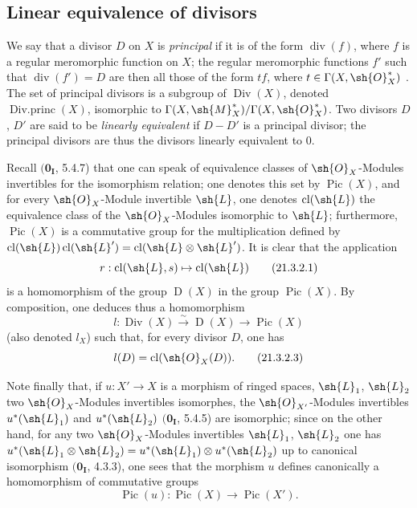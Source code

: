 \subsection{Linear equivalence of divisors}
\label{IV.21.3}


\begin{env}[21.3.1]
\label{IV.21.3.1}
We say that a divisor $D$ on $X$ is \emph{principal} if it is of the form $\operatorname{div}(f)$, where $f$ is a regular meromorphic function on $X$;
the regular meromorphic functions $f'$ such that $\operatorname{div}(f')=D$ are then all those of the form $tf$, where $t\in\Gamma(X,\sh{O}_X^*)$ .
The set of principal divisors is a subgroup of $\operatorname{Div}(X)$, denoted $\operatorname{Div.princ}(X)$, isomorphic to $\Gamma(X,\sh{M}_X^*)/\Gamma(X,\sh{O}_X^*)$.
Two divisors $D$, $D'$ are said to be \emph{linearly equivalent} if $D-D'$ is a principal divisor;
the principal divisors are thus the divisors linearly equivalent to $0$.
\end{env}

\begin{env}[21.3.2]
\label{IV.21.3.2}
Recall $(\mathbf{0_I}$, 5.4.7) that one can speak of equivalence classes of $\sh{O}_X$-Modules invertibles for the isomorphism relation;
one denotes this set by $\operatorname{Pic}(X)$, and for every $\sh{O}_X$-Module invertible $\sh{L}$, one denotes $\operatorname{cl}(\sh{L})$ the equivalence class of the $\sh{O}_X$-Modules isomorphic to $\sh{L}$;
furthermore, $\operatorname{Pic}(X)$ is a commutative group for the multiplication defined by $\operatorname{cl}(\sh{L})\operatorname{cl}(\sh{L}')=\operatorname{cl}(\sh{L}\otimes\sh{L}')$.
It is clear that the application
\[
\label{IV.21.3.2.1}
  r:\operatorname{cl}(\sh{L},s)\mapsto\operatorname{cl}(\sh{L})
  \tag{21.3.2.1}
\]
is a homomorphism of the group $\operatorname{D}(X)$  in the group $\operatorname{Pic}(X)$.
By composition, one deduces thus a homomorphism
\[
\label{IV.21.3.2.2}
  l:\operatorname{Div}(X)\xrightarrow{\sim}\operatorname{D}(X)\to\operatorname{Pic}(X)
  \tag{21.3.2.2}
\]
(also denoted $l_X$) such that, for every divisor $D$, one has
\[
\label{IV.21.3.2.3}
  l(D)=\operatorname{cl}(\sh{O}_X(D)).
  \tag{21.3.2.3}
\]

Note finally that, if $u:X'\to X$ is a morphism of ringed spaces, $\sh{L}_1$, $\sh{L}_2$ two $\sh{O}_X$-Modules invertibles isomorphes, the $\sh{O}_{X'}$-Modules invertibles $u^*(\sh{L}_1)$ and $u^*(\sh{L}_2)$ $(\mathbf{0_I}$, 5.4.5) are isomorphic;
since on the other hand, for any two $\sh{O}_X$-Modules invertibles $\sh{L}_1$, $\sh{L}_2$ one has $u^*(\sh{L}_1\otimes\sh{L}_2)=u^*(\sh{L}_1)\otimes u^*(\sh{L}_2)$ up to canonical isomorphism $(\mathbf{0_I}$, 4.3.3), one sees that the morphism $u$ defines canonically a homomorphism of commutative groups
\[
\label{IV.21.3.2.4}
  \operatorname{Pic}(u):\operatorname{Pic}(X)\to\operatorname{Pic}(X').
  \tag{21.3.2.4}
\]
\end{env}

